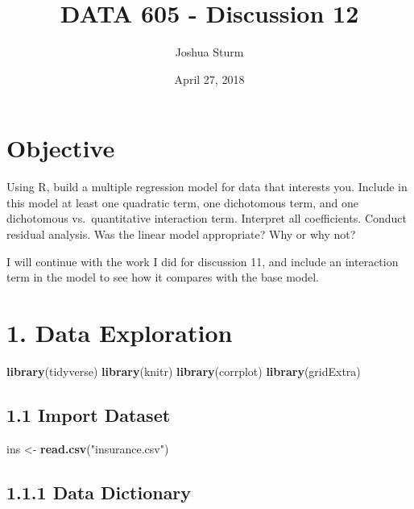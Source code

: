 \documentclass[]{article}
\title{DATA 605 - Discussion 12}
\author{Joshua Sturm}
\date{April 27, 2018}
\newenvironment{Shaded}{\begin{snugshade}}{\end{snugshade}}
\newcommand{\KeywordTok}[1]{\textcolor[rgb]{0.13,0.29,0.53}{\textbf{#1}}}
\newcommand{\StringTok}[1]{\textcolor[rgb]{0.31,0.60,0.02}{#1}}
\newcommand{\NormalTok}[1]{#1}
\begin{document}
\maketitle

\section{Objective}\label{objective}

Using R, build a multiple regression model for data that interests you.
Include in this model at least one quadratic term, one dichotomous term,
and one dichotomous vs.~quantitative interaction term. Interpret all
coefficients. Conduct residual analysis. Was the linear model
appropriate? Why or why not?

I will continue with the work I did for discussion 11, and include an
interaction term in the model to see how it compares with the base
model.

\section{1. Data Exploration}\label{data-exploration}

\begin{Shaded}
\begin{Highlighting}[]
\KeywordTok{library}\NormalTok{(tidyverse)}
\KeywordTok{library}\NormalTok{(knitr)}
\KeywordTok{library}\NormalTok{(corrplot)}
\KeywordTok{library}\NormalTok{(gridExtra)}
\end{Highlighting}
\end{Shaded}

\subsection{1.1 Import Dataset}\label{import-dataset}

\begin{Shaded}
\begin{Highlighting}[]
\NormalTok{ins <-}\StringTok{ }\KeywordTok{read.csv}\NormalTok{(}\StringTok{"insurance.csv"}\NormalTok{)}
\end{Highlighting}
\end{Shaded}

\subsection{1.1.1 Data Dictionary}\label{data-dictionary}
\end{document}

